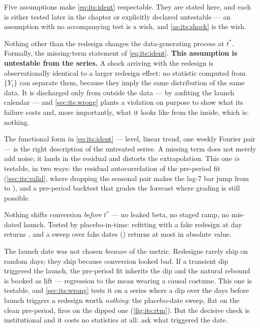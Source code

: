 Five assumptions make \cref{eq:its:ident} respectable. They are stated here, and each is either
tested later in the chapter or explicitly declared untestable --- an assumption with no
accompanying test is a wish, and \cref{as:its:shock} is the wish.

\begin{assumption}\label{as:its:shock}
Nothing other than the redesign changes the data-generating process at $t^{*}$. Formally, the
missing-term statement of \cref{eq:its:ident}. \textbf{This assumption is untestable from the
series.} A shock arriving with the redesign is observationally identical to a larger redesign
effect: no statistic computed from $\{Y_t\}$ can separate them, because they imply the same
distribution of the same data. It is discharged only from outside the data --- by auditing the
launch calendar --- and \cref{sec:its:wrong} plants a violation on purpose to show what its
failure costs and, more importantly, what it looks like from the inside, which is: nothing.
\end{assumption}

\begin{assumption}\label{as:its:form}
The functional form in \cref{eq:its:ident} --- level, linear trend, one weekly Fourier pair --- is
the right description of the untreated series. A missing term does not merely add noise; it lands
in the residual and distorts the extrapolation. This one \emph{is} testable, in two ways: the
residual autocorrelation of the pre-period fit (\cref{sec:its:valid}, where dropping the seasonal
pair makes the lag-7 bar jump from \nbTenAcfSeven{} to \nbTenAcfBadSeven), and a pre-period
backtest that grades the forecast where grading is still possible.
\end{assumption}

\begin{assumption}[No anticipation]\label{as:its:antic}
Nothing shifts conversion \emph{before} $t^{*}$ --- no leaked beta, no staged ramp, no mis-dated
launch. Tested by placebo-in-time: refitting with a fake redesign at day \nbTenFakeDay{} returns
\pp{\nbTenPlacebo}, and a sweep over fake dates (\nbTenPlaceboDates) returns at most
\pp{\nbTenPlaceboMax} in absolute value.
\end{assumption}

\begin{assumption}\label{as:its:date}
The launch date was not chosen \emph{because} of the metric. Redesigns rarely ship on random days;
they ship because conversion looked bad. If a transient dip triggered the launch, the pre-period
fit inherits the dip and the natural rebound is booked as lift --- regression to the mean wearing
a causal costume. This one is testable, and \cref{sec:its:wrong} tests it on a series where a
\pp{\nbTenRtmDip} dip over the \nbTenRtmDipLen{} days before launch triggers a redesign worth
\emph{nothing}: the placebo-date sweep, flat on the clean pre-period, fires on the dipped one
(\cref{fig:its:rtm}). But the decisive check is institutional and it costs no statistics at all:
ask what triggered the date.
\end{assumption}

